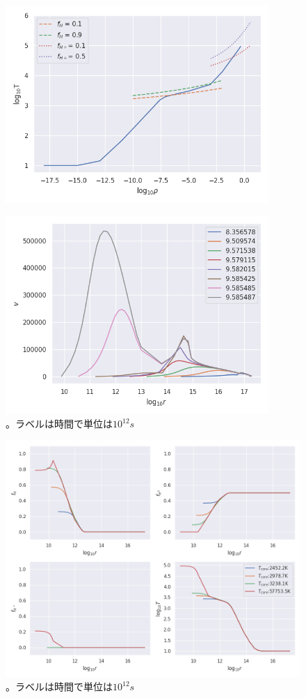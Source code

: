 \documentclass[a4j, dvipdfmx]{jsarticle}
\begin{document}
\begin{figure}[H]
    \includegraphics[clip,width=10.0cm]{graph/core.png}
    \caption{}
    \label{fig:core2nd}
\end{figure}
\begin{figure}[H]
    \includegraphics[clip,width=10.0cm]{graph/v_r.png}
    \caption{。ラベルは時間で単位は$10^{12}s$}
    \label{fig:v_r}
\end{figure}
\begin{figure}[H]
    \includegraphics[clip,width=17.0cm]{graph/f_r.png}
    \caption{。ラベルは時間で単位は$10^{12}s$}
    \label{fig:f_r}
\end{figure}



\end{document}
